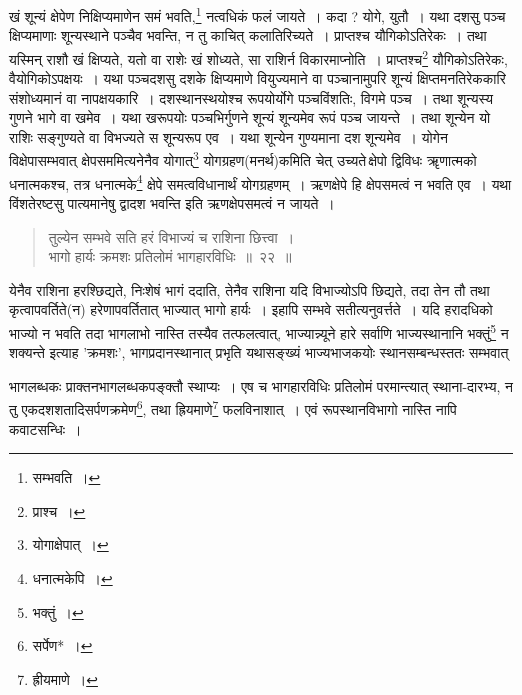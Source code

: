 \documentclass[10pt, openany]{book}
\begin{document}
{{खं शून्यं क्षेपेण निक्षिप्यमाणेन समं भवति,\renewcommand{\thefootnote}{\s ३}\footnote{\s सम्भवति~।} नत्वधिकं फलं जायते~।
कदा ? योगे, युतौ~।}
{यथा दशसु पञ्च क्षिप्यमाणाः शून्यस्थाने पञ्चैव भवन्ति, न तु काचित्
कलातिरिच्यते~।}
{प्राप्तश्च यौगिकोऽतिरेकः~। तथा यस्मिन् राशौ खं क्षिप्यते, यतो वा
राशेः खं शोध्यते, सा}
{राशिर्न विकारमाप्नोति~। प्राप्तश्च\renewcommand{\thefootnote}{\s ४}\footnote{\s प्राश्च~।}   यौगिकोऽतिरेकः, वैयोगिकोऽपक्षयः~। यथा पञ्चदशसु}
{दशके क्षिप्यमाणे वियुज्यमाने वा पञ्चानामुपरि शून्यं क्षिप्तमनतिरेककारि
संशोध्यमानं वा}
{नापक्षयकारि~। दशस्थानस्थयोश्च रूपयोर्योगे पञ्चविंशतिः, विगमे पञ्च~। तथा
शून्यस्य}
{गुणने भागे वा खमेव~। यथा खरूपयोः पञ्चभिर्गुणने शून्यं शून्यमेव रूपं
पञ्च जायन्ते~।}
{तथा शून्येन यो राशिः सङ्गुण्यते वा विभज्यते स शून्यरूप एव~। यथा शून्येन
गुण्यमाना}
{दश शून्यमेव~। योगेन विक्षेपासम्भवात् क्षेपसममित्यनेनैव योगात्\renewcommand{\thefootnote}{\s ५}\footnote{\s योगाक्षेपात्~।}  
योगग्रहण(मनर्थ)कमिति चेत् उच्यते\textendash \,क्षेपो द्विविधः ॠणात्मको धनात्मकश्च, तत्र
धनात्मके\renewcommand{\thefootnote}{\s ६}\footnote{\s धनात्मकेपि~।} क्षेपे समत्वविधानार्थं योगग्रहणम्~। ऋणक्षेपे हि क्षेपसमत्वं न भवति एव~। यथा
विंशतेरष्टसु पात्यमानेषु}
{द्वादश भवन्ति इति ऋणक्षेपसमत्वं न जायते~।}

\begin{quote} {\bs तुल्येन सम्भवे सति हरं विभाज्यं च राशिना छित्त्वा~। \\
 भागो हार्यः क्रमशः प्रतिलोमं भागहारविधिः~॥~२२~॥}\end{quote}

{येनैव राशिना हरश्छिद्यते, निःशेषं भागं ददाति, तेनैव राशिना यदि
विभाज्योऽपि}
{छिद्यते, तदा तेन तौ तथा कृत्वापवर्तिते(न) हरेणापवर्तितात् भाज्यात् भागो
हार्यः~। इहापि}
{सम्भवे सतीत्यनुवर्त्तते~। यदि हरादधिको भाज्यो न भवति तदा भागलाभो नास्ति
तस्यैव}
{तत्फलत्वात्, भाज्यान्न्यूने हारे सर्वाणि भाज्यस्थानानि भक्तुं\renewcommand{\thefootnote}{\s ७}\footnote{\s भक्तुं~।}   न
शक्यन्ते इत्याह 'क्रमशः',}
{भागप्रदानस्थानात् प्रभृति यथासङ्ख्यं भाज्यभाजकयोः स्थानसम्बन्धस्ततः
सम्भवात्}

\newpage

{भागलब्धकः प्राक्तनभागलब्धकपङ्क्तौ स्थाप्यः~। एष च भागहारविधिः प्रतिलोमं}
{परमान्त्यात् स्थाना-दारभ्य, न तु एकदशशतादिसर्पणक्रमेण\renewcommand{\thefootnote}{\s २}\footnote{\s *सर्पेण*~।}, तथा
ह्रियमाणे\renewcommand{\thefootnote}{\s ३}\footnote{\s ह्रीयमाणे~।}  फलविनाशात्~।}
{एवं रूपस्थानविभागो नास्ति नापि कवाटसन्धिः~।}

}
\end{document}
